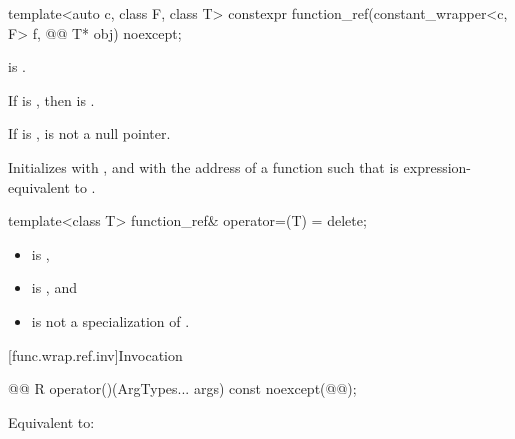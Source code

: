 \begin{itemdecl}
template<auto c, class F, class T>
  constexpr function_ref(constant_wrapper<c, F> f, @\cv{}@ T* obj) noexcept;
\end{itemdecl}

\begin{itemdescr}
\pnum
\constraints
{} is .

\pnum
\mandates
If  is , then  is .

\pnum
\expects
If  is ,  is not a null pointer.

\pnum
\effects
Initializes  with , and  with the address of a function  such that  is expression-equivalent to .
\end{itemdescr}

\begin{itemdecl}
template<class T> function_ref& operator=(T) = delete;
\end{itemdecl}

\begin{itemdescr}
\pnum
\constraints
\begin{itemize}
\item {} is ,
\item {} is , and
\item {} is not a specialization of .
\end{itemize}
\end{itemdescr}

[func.wrap.ref.inv]{Invocation}

\begin{itemdecl}
@@ R operator()(ArgTypes... args) const noexcept(@@);
\end{itemdecl}

\begin{itemdescr}
\pnum
\effects
Equivalent to: 
\end{itemdescr}

